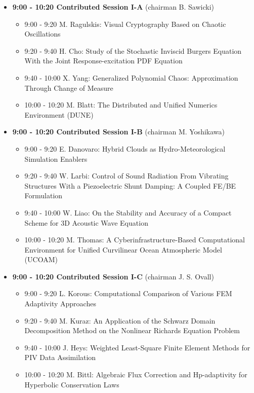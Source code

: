 \documentclass[10pt]{article}%
\begin{document}
\begin{itemize}    
  \item {\bf 9:00 - 10:20 Contributed Session I-A} (chairman B. Sawicki) 
  \begin{itemize}
    \item 9:00 - 9:20 {M. Ragulskis}: {Visual Cryptography Based on Chaotic Oscillations}  %
    \item 9:20 - 9:40 {H. Cho}: {Study of the Stochastic Inviscid Burgers Equation With the Joint Response-excitation PDF Equation}
    \item 9:40 - 10:00 {X. Yang}: {Generalized Polynomial Chaos: Approximation Through Change of Measure}
    \item 10:00 - 10:20 {M. Blatt}: {The Distributed and Unified Numerics Environment (DUNE)}
  \end{itemize}
  \item {\bf 9:00 - 10:20 Contributed Session I-B} (chairman M. Yoshikawa) 
  \begin{itemize}
    \item 9:00 - 9:20 {E. Danovaro}: {Hybrid Clouds as Hydro-Meteorological Simulation Enablers}
    \item 9:20 - 9:40 {W. Larbi}: {Control of Sound Radiation From Vibrating Structures With a Piezoelectric Shunt Damping: A Coupled FE/BE Formulation}
    \item 9:40 - 10:00 {W. Liao}: {On the Stability and Accuracy of a Compact Scheme for 3D Acoustic Wave Equation}
    \item 10:00 - 10:20 {M. Thomas}: {A Cyberinfrastructure-Based Computational Environment for Unified Curvilinear Ocean Atmospheric Model  (UCOAM)}
  \end{itemize}
    \item {\bf 9:00 - 10:20 Contributed Session I-C} (chairman J. S. Ovall) 
  \begin{itemize}
    \item 9:00 - 9:20 {L. Korous}: {Computational Comparison of Various FEM Adaptivity Approaches}
    \item 9:20 - 9:40 {M. Kuraz}: {An Application of the Schwarz Domain Decomposition Method on the Nonlinear Richards Equation Problem} %
    \item 9:40 - 10:00 {J. Heys}: {Weighted Least-Square Finite Element Methods for PIV Data Assimilation}
    \item 10:00 - 10:20 {M. Bittl}: {Algebraic Flux Correction and Hp-adaptivity for Hyperbolic Conservation Laws}

\end{itemize}
\end{itemize}
\end{document}
